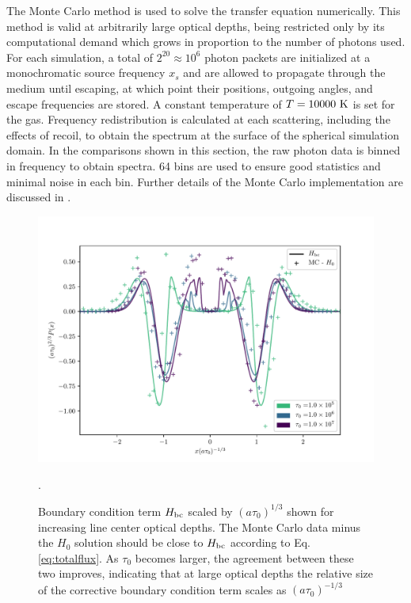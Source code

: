 \documentclass{aastex63}
\begin{document}
The Monte Carlo method is used to solve the transfer equation numerically. This method is valid at arbitrarily large optical depths, being restricted only by its computational demand which grows in proportion to the number of photons used. For each simulation, a total of $2^{20} \approx 10^6$ photon packets are initialized at a monochromatic source frequency $x_s$ and are allowed to propagate through the medium until escaping, at which point their positions, outgoing angles, and escape frequencies are stored. A constant temperature of $T=10000\ \rm K$ is set for the gas. Frequency redistribution is calculated at each scattering, including the effects of recoil, to obtain the spectrum at the surface of the spherical simulation domain. In the comparisons shown in this section, the raw photon data is binned in frequency to obtain spectra. 64 bins are used to ensure good statistics and minimal noise in each bin. Further details of the Monte Carlo implementation are discussed in \cite{2017ApJ...851..150H}.

\ifx
\begin{figure}
    \centering
    \includegraphics{taubc.pdf}
    \caption{Boundary condition term $H_{\rm bc}$ scaled by $(a\tau_0)^{1/3}$ shown for increasing line center optical depths. The Monte Carlo data minus the $H_0$ solution should be close to $H_{\rm bc}$ according to Eq. \ref{eq:totalflux}. As $\tau_0$ becomes larger, the agreement between these two improves, indicating that at large optical depths the relative size of the corrective boundary condition term scales as $(a\tau_0)^{-1/3}$}.
    \label{fig:taubc}
\end{figure}
\fi
\end{document}
